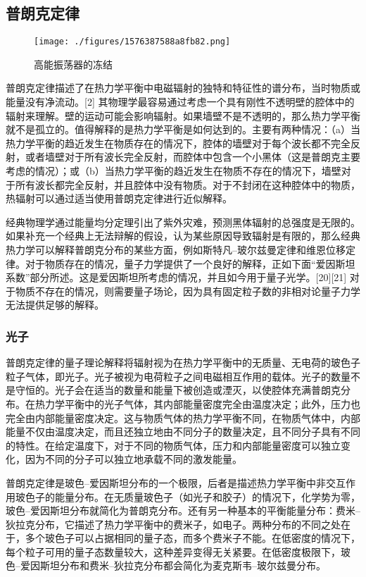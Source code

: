 \subsection{普朗克定律}
\begin{figure}[ht]
\centering
\texttt{[image: ./figures/1576387588a8fb82.png]}
\caption{高能振荡器的冻结} \label{fig_HTFS_5}
\end{figure}
普朗克定律描述了在热力学平衡中电磁辐射的独特和特征性的谱分布，当时物质或能量没有净流动。[2] 其物理学最容易通过考虑一个具有刚性不透明壁的腔体中的辐射来理解。壁的运动可能会影响辐射。如果墙壁不是不透明的，那么热力学平衡就不是孤立的。值得解释的是热力学平衡是如何达到的。主要有两种情况：（a）当热力学平衡的趋近发生在物质存在的情况下，腔体的墙壁对于每个波长都不完全反射，或者墙壁对于所有波长完全反射，而腔体中包含一个小黑体（这是普朗克主要考虑的情况）；或（b）当热力学平衡的趋近发生在物质不存在的情况下，墙壁对于所有波长都完全反射，并且腔体中没有物质。对于不封闭在这种腔体中的物质，热辐射可以通过适当使用普朗克定律进行近似解释。

经典物理学通过能量均分定理引出了紫外灾难，预测黑体辐射的总强度是无限的。如果补充一个经典上无法辩解的假设，认为某些原因导致辐射是有限的，那么经典热力学可以解释普朗克分布的某些方面，例如斯特凡–玻尔兹曼定律和维恩位移定律。对于物质存在的情况，量子力学提供了一个良好的解释，正如下面“爱因斯坦系数”部分所述。这是爱因斯坦所考虑的情况，并且如今用于量子光学。[20][21] 对于物质不存在的情况，则需要量子场论，因为具有固定粒子数的非相对论量子力学无法提供足够的解释。
\subsubsection{光子}
普朗克定律的量子理论解释将辐射视为在热力学平衡中的无质量、无电荷的玻色子粒子气体，即光子。光子被视为电荷粒子之间电磁相互作用的载体。光子的数量不是守恒的。光子会在适当的数量和能量下被创造或湮灭，以使腔体充满普朗克分布。在热力学平衡中的光子气体，其内部能量密度完全由温度决定；此外，压力也完全由内部能量密度决定。这与物质气体的热力学平衡不同，在物质气体中，内部能量不仅由温度决定，而且还独立地由不同分子的数量决定，且不同分子具有不同的特性。在给定温度下，对于不同的物质气体，压力和内部能量密度可以独立变化，因为不同的分子可以独立地承载不同的激发能量。

普朗克定律是玻色–爱因斯坦分布的一个极限，后者是描述热力学平衡中非交互作用玻色子的能量分布。在无质量玻色子（如光子和胶子）的情况下，化学势为零，玻色–爱因斯坦分布就简化为普朗克分布。还有另一种基本的平衡能量分布：费米–狄拉克分布，它描述了热力学平衡中的费米子，如电子。两种分布的不同之处在于，多个玻色子可以占据相同的量子态，而多个费米子不能。在低密度的情况下，每个粒子可用的量子态数量较大，这种差异变得无关紧要。在低密度极限下，玻色–爱因斯坦分布和费米–狄拉克分布都会简化为麦克斯韦–玻尔兹曼分布。
